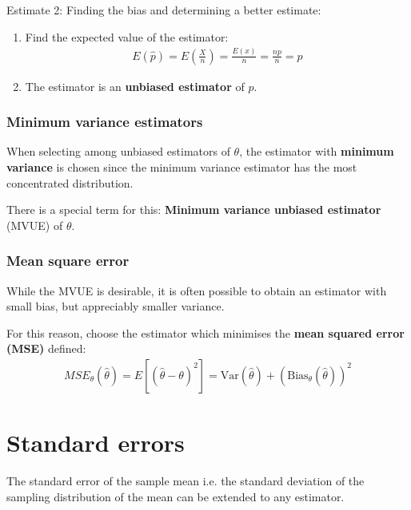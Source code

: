 \documentclass[10pt,a4paper]{article}
\begin{document}
Estimate 2: Finding the bias and determining a better estimate:
\begin{enumerate}
    \item Find the expected value of the estimator:
    \begin{align*}
        E(\hat{p}) = E\left(\frac{X}{n}\right) = \frac{E(x)}{n} = \frac{np}{n} = p
    \end{align*}
    \item The estimator is an \textbf{unbiased estimator} of $p$.
\end{enumerate}

\subsubsection{Minimum variance estimators}

When selecting among unbiased estimators of $\theta$, the estimator with \textbf{minimum variance}
is chosen since the minimum variance estimator has the most concentrated distribution. 

There is a special term for this: \textbf{Minimum variance unbiased estimator} (MVUE) of $\theta$.

\subsubsection{Mean square error}

While the MVUE is desirable, it is often possible to obtain an estimator with small bias, but
appreciably smaller variance.

For this reason, choose the estimator which minimises the \textbf{mean squared error (MSE)} deﬁned:
\begin{align*}
    MSE_\theta (\hat{\theta}) = E[(\hat{\theta}-\theta)^2] = \text{Var}(\hat{\theta}) + \left(\text{Bias}_\theta(\hat{\theta}) \right)^2
\end{align*}

\section{Standard errors}

The standard error of the sample mean i.e. the standard deviation of the sampling distribution of the
mean can be extended to any estimator.
\end{document}
